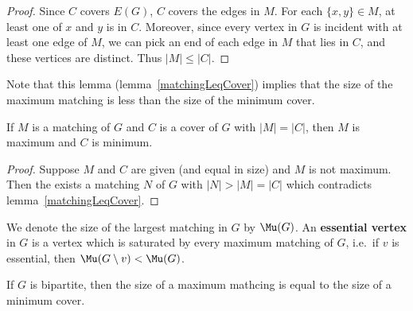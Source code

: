 \documentclass[12pt]{article}
\begin{document}
\begin{proof}
Since $C$ covers $E(G)$, $C$ covers the edges in $M$. For each $\{x,y\} \in M$, at least one of $x$ and $y$ is in $C$. Moreover, since every vertex in $G$ is incident with at least one edge of $M$, we can pick an end of each edge in $M$ that lies in $C$, and these vertices are distinct. Thus $|M| \leq |C|$.
\end{proof}

Note that this lemma (lemma~\ref{matchingLeqCover}) implies that the size of the maximum matching is less than the size of the minimum cover.

\begin{lemma}
If $M$ is a matching of $G$ and $C$ is a cover of $G$ with $|M| = |C|$, then $M$ is maximum and $C$ is minimum.
\end{lemma}

\begin{proof}
Suppose $M$ and $C$ are given (and equal in size) and $M$ is not maximum. Then the exists a matching $N$ of $G$ with $|N| > |M| = |C|$ which contradicts lemma~\ref{matchingLeqCover}.
\end{proof}

We denote the size of the largest matching in $G$ by $\Mu(G)$. An {\bf essential vertex} in $G$ is a vertex which is saturated by every maximum matching of $G$, i.e.\ if $v$ is essential, then $\Mu(G\setminus v) < \Mu(G)$.

\begin{theorem}
If $G$ is bipartite, then the size of a maximum mathcing is equal to the size of a minimum cover.
\end{theorem}
\end{document}
